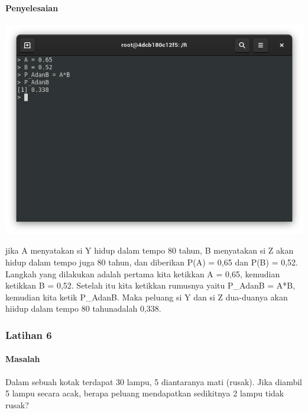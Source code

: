 \documentclass[a4paper,12pt]{article}
\begin{document}
\paragraph{Penyelesaian\\}
\begin{center}
	\includegraphics[scale=.5]{lat5}
\end{center}
jika A menyatakan si Y hidup dalam tempo 80 tahun, B menyatakan si Z akan hidup dalam tempo juga 80 tahun, dan diberikan P(A) = 0,65 dan P(B) = 0,52. Langkah yang dilakukan adalah pertama kita ketikkan A = 0,65, kemudian ketikkan B = 0,52. Setelah itu kita ketikkan rumusnya yaitu P\_AdanB = A*B, kemudian kita ketik P\_AdanB. Maka peluang si Y dan si Z dua-duanya akan hiidup dalam tempo 80 tahunadalah 0,338.

\subsubsection{Latihan 6}
\paragraph{Masalah\\}
Dalam sebuah kotak terdapat 30 lampu, 5 diantaranya mati (rusak). Jika diambil 5 lampu secara acak, berapa peluang mendapatkan sedikitnya 2 lampu tidak rusak?
\end{document}
